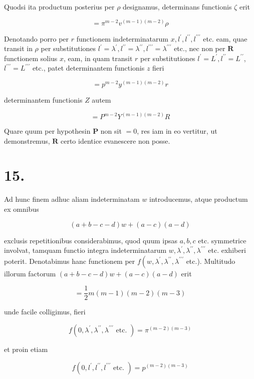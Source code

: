 \documentclass[10pt]{article}
\begin{document}
Quodsi ita productum posterius per \(\rho\) designamus, determinans functionis \(\zeta\) erit

\[
=\pi^{m-2} v^{(m-1)(m-2)} \rho
\]

Denotando porro per \(r\) functionem indeterminatarum \(x, l^{\prime}, l^{\prime \prime}, l^{\prime \prime \prime}\) etc. eam, quae transit in \(\rho\) per substitutiones \(l^{\prime}=\lambda^{\prime}, l^{\prime \prime}=\lambda^{\prime \prime}, l^{\prime \prime \prime}=\lambda^{\prime \prime \prime}\) etc., nec non per \(\boldsymbol{R}\)
functionem solius \(x\), eam, in quam transit \(r\) per substitutiones \(l^{\prime}=L^{\prime}, l^{\prime \prime}=L^{\prime \prime}\), \(l^{\prime \prime \prime}=L^{\prime \prime \prime}\) etc., patet determinantem functionis \(z\) fieri

\[
=p^{m-2} y^{(m-1)(m-2)} r
\]

determinantem functionis \(Z\) autem

\[
=P^{m-2} Y^{(m-1)(m-2)} R
\]

Quare quum per hypothesin \(\boldsymbol{P}\) non sit \(=0\), res iam in eo vertitur, ut demonstremus, \(\boldsymbol{R}\) certo identice evanescere non posse.

\section*{15.}
Ad hunc finem adhuc aliam indeterminatam \(w\) introducemus, atque productum ex omnibus

\[
(a+b-c-d) w+(a-c)(a-d)
\]

exclusis repetitionibus considerabimus, quod quum ipsas \(a, b, c\) etc. symmetrice involvat, tamquam functio integra indeterminatarum \(w, \lambda^{\prime}, \lambda^{\prime \prime}, \lambda^{\prime \prime \prime}\) etc. exhiberi poterit. Denotabimus hanc functionem per \(f\left(w, \lambda^{\prime}, \lambda^{\prime \prime}, \lambda^{\prime \prime \prime}\right.\) etc.). Multitudo illorum factorum \((a+b-c-d) w+(a-c)(a-d)\) erit

\[
=\frac{1}{2} m(m-1)(m-2)(m-3)
\]

unde facile colligimus, fieri

\[
f\left(0, \lambda^{\prime}, \lambda^{\prime \prime}, \lambda^{\prime \prime \prime} \text { etc. }\right)=\pi^{(m-2)(m-3)}
\]

et proin etiam

\[
f\left(0, l^{\prime}, l^{\prime \prime}, l^{\prime \prime \prime} \text { etc. }\right)=p^{(m-2)(m-3)}
\]
\end{document}
